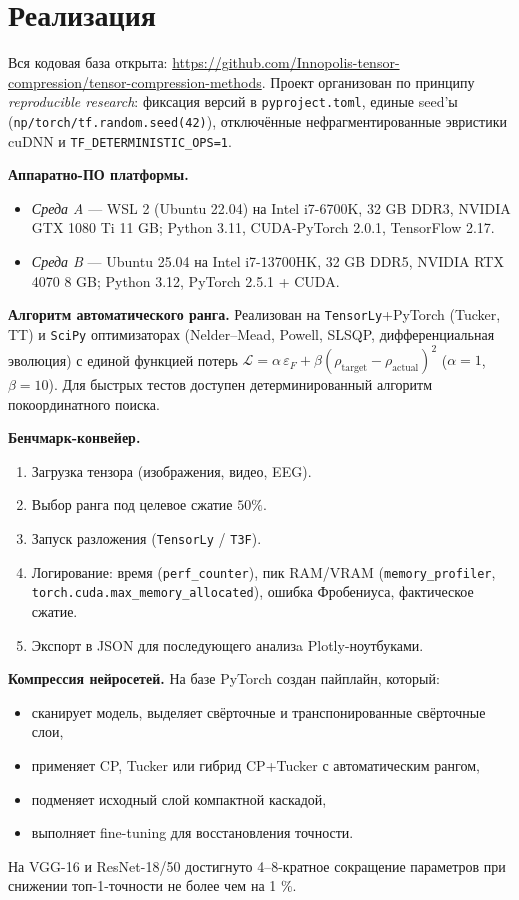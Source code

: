 \chapter{Реализация}
\label{chap:implementation}

Вся кодовая база открыта: \url{https://github.com/Innopolis-tensor-compression/tensor-compression-methods}.  
Проект организован по принципу \emph{reproducible research}: фиксация версий в \texttt{pyproject.toml}, единые seed’ы (\texttt{np/torch/tf.random.seed(42)}), отключённые нефрагментированные эвристики cuDNN и \texttt{TF\_DETERMINISTIC\_OPS=1}.  

\textbf{Аппаратно-ПО платформы.}
\begin{itemize}\setlength\itemsep{0.15em}
    \item \emph{Среда A} — WSL 2 (Ubuntu 22.04) на Intel i7-6700K, 32 GB DDR3, NVIDIA GTX 1080 Ti 11 GB; Python 3.11, CUDA-PyTorch 2.0.1, TensorFlow 2.17.  
    \item \emph{Среда B} — Ubuntu 25.04 на Intel i7-13700HK, 32 GB DDR5, NVIDIA RTX 4070 8 GB; Python 3.12, PyTorch 2.5.1 + CUDA.  
\end{itemize}

\textbf{Алгоритм автоматического ранга.}  
Реализован на \texttt{TensorLy}+PyTorch (Tucker, TT) и \texttt{SciPy} оптимизаторах (Nelder–Mead, Powell, SLSQP, дифференциальная эволюция) с единой функцией потерь  
$\mathcal{L}=\alpha\,\varepsilon_F+\beta(\rho_{\text{target}}-\rho_{\text{actual}})^2$  
($\alpha{=}1$, $\beta{=}10$).  Для быстрых тестов доступен детерминированный алгоритм покоординатного поиска.

\textbf{Бенчмарк-конвейер.}  
\begin{enumerate}\setlength\itemsep{0.15em}
    \item Загрузка тензора (изображения, видео, EEG).  
    \item Выбор ранга под целевое сжатие $50\%$.  
    \item Запуск разложения (\texttt{TensorLy} / \texttt{T3F}).  
    \item Логирование: время (\texttt{perf\_counter}), пик RAM/V\!RAM (\texttt{memory\_profiler}, \texttt{torch.cuda.max\_memory\_allocated}), ошибка Фробениуса, фактическое сжатие.  
    \item Экспорт в JSON для последующего анализa Plotly-ноутбуками.  
\end{enumerate}

\textbf{Компрессия нейросетей.}  
На базе PyTorch создан пайплайн, который:
\begin{itemize}\setlength\itemsep{0.15em}
    \item сканирует модель, выделяет свёрточные и транспонированные свёрточные слои,  
    \item применяет CP, Tucker или гибрид CP+Tucker с автоматическим рангом,  
    \item подменяет исходный слой компактной каскадой,  
    \item выполняет fine-tuning для восстановления точности.  
\end{itemize}
На VGG-16 и ResNet-18/50 достигнуто 4–8-кратное сокращение параметров при снижении топ-1-точности не более чем на 1 \%.

